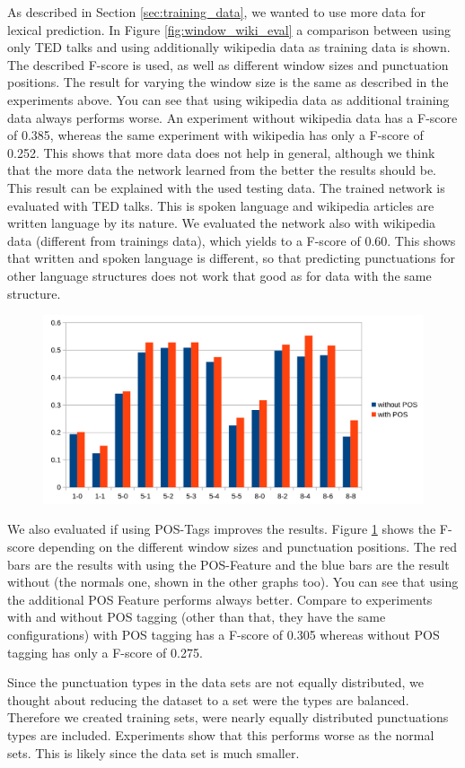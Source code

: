 As described in Section \ref{sec:training_data}, we wanted to use more data for lexical prediction.
In Figure \ref{fig:window_wiki_eval} a comparison between using only TED talks and using additionally wikipedia data as training data is shown.
The described F-score is used, as well as different window sizes and punctuation positions.
The result for varying the window size is the same as described in the experiments above.
You can see that using wikipedia data as additional training data always performs worse.
An experiment without wikipedia data has a F-score of 0.385, whereas the same experiment with wikipedia has only a F-score of 0.252.
This shows that more data does not help in general, although we think that the more data the network learned from the better the results should be.
This result can be explained with the used testing data.
The trained network is evaluated with TED talks.
This is spoken language and wikipedia articles are written language by its nature.
We evaluated the network also with wikipedia data (different from trainings data), which yields to a F-score of 0.60.
This shows that written and spoken language is different, so that predicting punctuations for other language structures does not work that good as for data with the same structure.

\begin{figure}[ht]
    \centering
    \includegraphics[width=\textwidth]{img/window_pos_eval.png}
    \caption{}
    \label{fig:window_pos_eval}
\end{figure}

We also evaluated if using POS-Tags improves the results. Figure \ref{fig:window_pos_eval} shows the F-score depending on the different window sizes and punctuation positions. The red bars are the results with using the POS-Feature and the blue bars are the result without (the normals one, shown in the other graphs too).
You can see that using the additional POS Feature performs always better.
Compare to experiments with and without POS tagging (other than that, they have the same configurations) with POS tagging has a F-score of 0.305 whereas without POS tagging has only a F-score of 0.275.

Since the punctuation types in the data sets are not equally distributed, we thought about reducing the dataset to a set were the types are balanced. Therefore we created training sets, were nearly equally distributed punctuations types are included. Experiments show that this performs worse as the normal sets. This is likely since the data set is much smaller.
